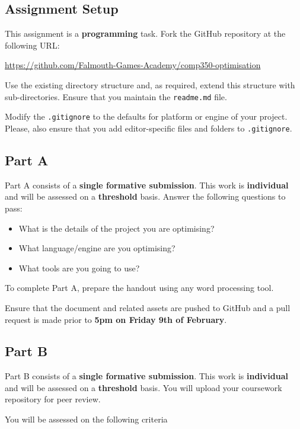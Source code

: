 \documentclass{../../fal_assignment}
\begin{document}
\subsection*{Assignment Setup}

This assignment is a \textbf{programming} task. Fork the GitHub repository at the following URL:

\indent \url{https://github.com/Falmouth-Games-Academy/comp350-optimisation}

Use the existing directory structure and, as required, extend this structure with sub-directories.
Ensure that you maintain the \texttt{readme.md} file.

Modify the \texttt{.gitignore} to the defaults for platform or engine of your project.
Please, also ensure that you add editor-specific files and folders to \texttt{.gitignore}. 

\subsection*{Part A}

Part A consists of a \textbf{single formative submission}. This work is \textbf{individual} and will be assessed on a \textbf{threshold} basis. Answer the following questions to pass:

\begin{itemize}
	\item What is the details of the project you are optimising?
	\item What language/engine are you optimising?
	\item What tools are you going to use?
\end{itemize}

To complete Part A, prepare the handout using any word processing tool.

Ensure that the document and related assets are pushed to GitHub and a pull request is made prior to \textbf{5pm on Friday 9th of February}.

\subsection*{Part B}

Part B consists of a \textbf{single formative submission}. This work is \textbf{individual} and will be assessed on a \textbf{threshold} basis. You will upload your coursework repository for peer review.

You will be assessed on the following criteria 
\end{document}
